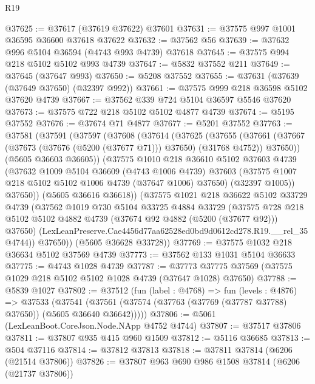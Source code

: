 \begin{lexlean}{R19}
\begin{coremodule}
{{{{{{{{{{{@37625 := @37617 (@37619 @37622) @37601
@37631 := @37575 @997 @1001 @36595 @36600 @37618 @37622
@37632 := @37562 @56
@37639 := @37632 @996 @5104 @36594 (@4743 @993 @4739) @37618
@37645 := @37575 @994 @218 @5102 @5102 @993 @4739
@37647 := @5832 @37552 @211
@37649 := @37645 (@37647 @993)
@37650 := @5208 @37552
@37655 := @37631 (@37639 (@37649 @37650) (@32397 @992))
@37661 := @37575 @999 @218 @36598 @5102 @37620 @4739
@37667 := @37562 @339 @724 @5104 @36597 @5546 @37620
@37673 := @37575 @722 @218 @5102 @5102 @4877 @4739
@37674 := @5195 @37552
@37676 := @37674 @71 @4877
@37677 := @5201 @37552
@37763 := @37581
    (@37591
      (@37597
        (@37608
          (@37614
            (@37625
              (@37655
                (@37661
                  (@37667 (@37673 (@37676 (@5200 (@37677 @71))) @37650) (@31768 @4752))
                  @37650))
              (@5605 @36603 @36605))
            (@37575
              @1010
              @218
              @36610
              @5102
              @37603
              @4739
              (@37632
                @1009
                @5104
                @36609
                (@4743 @1006 @4739)
                @37603
                (@37575 @1007 @218 @5102 @5102 @1006 @4739 (@37647 @1006) @37650)
                (@32397 @1005))
              @37650))
          (@5605 @36616 @36618))
        (@37575
          @1021
          @218
          @36622
          @5102
          @33729
          @4739
          (@37562
            @1019
            @730
            @5104
            @33725
            @4884
            @33729
            (@37575
              @728
              @218
              @5102
              @5102
              @4882
              @4739
              (@37674 @92 @4882 (@5200 (@37677 @92)))
              @37650)
            (LexLeanPreserve.Cae4456d77aa62528ed0bd9d0612cd278.R19.__rel_35 @4744))
          @37650))
      (@5605 @36628 @33728))
@37769 := @37575 @1032 @218 @36634 @5102 @37569 @4739
@37773 := @37562 @133 @1031 @5104 @36633
@37775 := @4743 @1028 @4739
@37787 := @37773 @37775 @37569 (@37575 @1029 @218 @5102 @5102 @1028 @4739 (@37647 @1028) @37650)
@37788 := @5839 @1027
@37802 := @37512
    (fun (label : @4768) =>
    fun (levels : @4876) =>
    @37533
      (@37541 (@37561 (@37574 (@37763 (@37769 (@37787 @37788) @37650)) (@5605 @36640 @36642)))))
@37806 := @5061 (LexLeanBoot.CoreJson.Node.NApp @4752 @4744)
@37807 := @37517 @37806
@37811 := @37807 @935 @415 @960 @1509
@37812 := @5116 @36685
@37813 := @504 @37116
@37814 := @37812 @37813
@37818 := @37811 @37814 (@6206 (@21514 @37806))
@37826 := @37807 @963 @690 @986 @1508 @37814 (@6206 (@21737 @37806))
}}}}}}}}}}}
\end{coremodule}
\end{lexlean}
